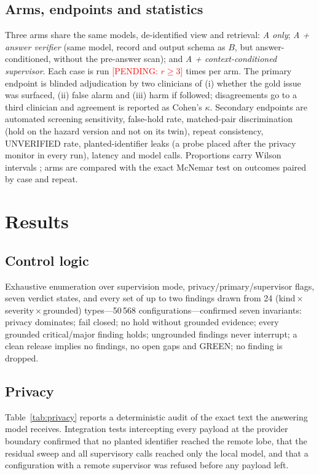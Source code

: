 \documentclass[journal]{IEEEtran}
\newcommand{\pending}[1]{\textcolor{red}{[PENDING: #1]}}
\begin{document}
\subsection{Arms, endpoints and statistics}
Three arms share the same models, de-identified view and retrieval: \emph{A only}; \emph{A + answer verifier} (same model, record and output schema as $B$, but answer-conditioned, without the pre-answer scan); and \emph{A + context-conditioned supervisor}. Each case is run \pending{$r\geq3$} times per arm. The primary endpoint is blinded adjudication by two clinicians of (i) whether the gold issue was surfaced, (ii) false alarm and (iii) harm if followed; disagreements go to a third clinician and agreement is reported as Cohen's $\kappa$. Secondary endpoints are automated screening sensitivity, false-hold rate, matched-pair discrimination (hold on the hazard version and not on its twin), repeat consistency, UNVERIFIED rate, planted-identifier leaks (a probe placed after the privacy monitor in every run), latency and model calls. Proportions carry Wilson intervals \cite{wilson1927}; arms are compared with the exact McNemar test \cite{mcnemar1947} on outcomes paired by case and repeat.

\section{Results}
\subsection{Control logic}
Exhaustive enumeration over supervision mode, privacy/primary/supervisor flags, seven verdict states, and every set of up to two findings drawn from 24 (kind\,$\times$\,severity\,$\times$\,grounded) types---50\,568 configurations---confirmed seven invariants: privacy dominates; fail closed; no hold without grounded evidence; every grounded critical/major finding holds; ungrounded findings never interrupt; a clean release implies no findings, no open gaps and GREEN; no finding is dropped.

\subsection{Privacy}
Table~\ref{tab:privacy} reports a deterministic audit of the exact text the answering model receives. Integration tests intercepting every payload at the provider boundary confirmed that no planted identifier reached the remote lobe, that the residual sweep and all supervisory calls reached only the local model, and that a configuration with a remote supervisor was refused before any payload left.
\end{document}
